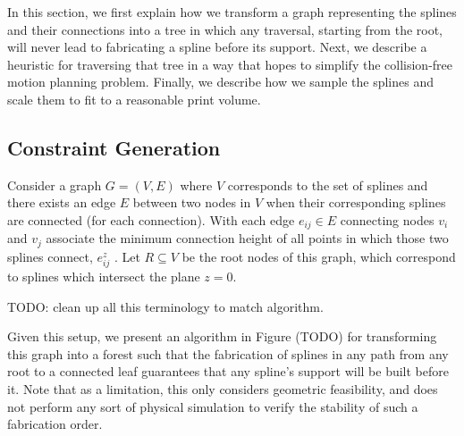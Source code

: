 \documentclass[conference]{acmsiggraph}
\begin{document}
In this section, we first explain how we transform a graph representing the splines and their connections into a tree in which any traversal, starting from the root, will never lead to fabricating a spline before its support.  Next, we describe a heuristic for traversing that tree in a way that hopes to simplify the collision-free motion planning problem.  Finally, we describe how we sample the splines and scale them to fit to a reasonable print volume.

\subsection{Constraint Generation}

Consider a graph $G = (V, E)$ where $V$ corresponds to the set of splines and there exists an edge $E$ between two nodes in $V$ when their corresponding splines are connected (for each connection).  With each edge $e_{ij} \in E$ connecting nodes $v_i$ and $v_j$ associate the minimum connection height of all points in which those two splines connect, $e_{ij}^z$
.  Let $R \subseteq V$ be the root nodes of this graph, which correspond to splines which intersect the plane $z=0$.

TODO: clean up all this terminology to match algorithm.

Given this setup, we present an algorithm in Figure (TODO) for transforming this graph into a forest such that the fabrication of splines in any path from any root to a connected leaf guarantees that any spline's support will be built before it.  Note that as a limitation, this only considers geometric feasibility, and does not perform any sort of physical simulation to verify the stability of such a fabrication order.
\end{document}
